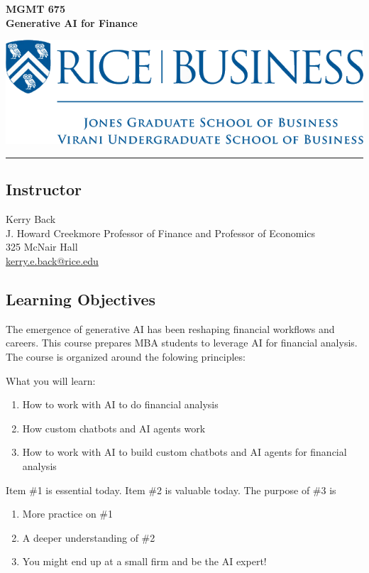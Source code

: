 \documentclass[11pt]{article}
\begin{document}
\begin{minipage}[c][3cm][c]{0.5\textwidth}
\Large\textbf{MGMT 675\\ Generative AI for Finance}
\end{minipage}
\hfill
\begin{minipage}[c][3cm][c]{0.4\textwidth}
\includegraphics[width=\textwidth]{rice-business-transparent-final.png}
\end{minipage}

\vspace{0.5cm}
\hrule

\subsection*{Instructor}
Kerry Back\\
J. Howard Creekmore Professor of Finance and Professor of Economics\\
325 McNair Hall\\
\href{mailto:kerry.e.back@rice.edu}{kerry.e.back@rice.edu}

\subsection*{Learning Objectives}

The emergence of generative AI has been reshaping financial workflows and careers. This course prepares MBA students to leverage AI for financial analysis.  The course is organized around the folowing principles:

What you will learn:
\begin{enumerate}
\item How to work with AI to do financial analysis
\item How custom chatbots and AI agents work 
\item How to work with AI to build custom chatbots and AI agents for financial analysis
\end{enumerate}


Item \#1 is essential today. Item \#2 is valuable today. The purpose of \#3 is
\begin{enumerate}\renewcommand{\labelenumi}{3.\arabic{enumi}}
\item More practice on  \#1
\item A deeper understanding of  \#2
\item You might end up at a small firm and be the AI expert!
\end{enumerate}
\end{document}
